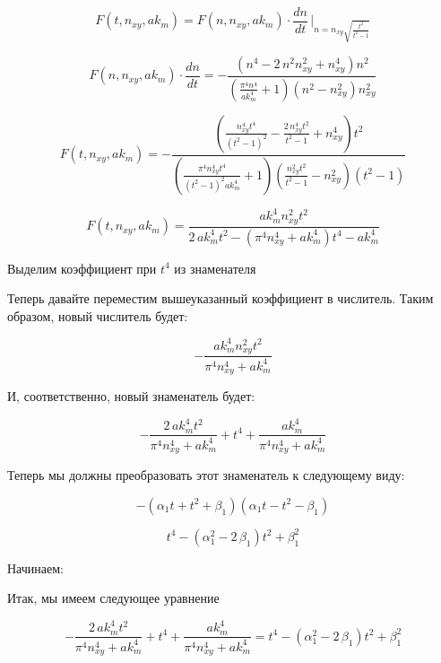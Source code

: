 \documentclass[11pt]{article}
\begin{document}
    \[F\left(t, n_{xy}, ak_m\right) = F\left(n, n_{xy}, ak_m\right) \cdot \frac{dn}{dt} \, \Bigg\rvert_{ n = n_{\mathit{xy}} \sqrt{\frac{t^{2}}{t^{2} - 1}} }\]

\[F\left(n, n_{xy}, ak_m\right) \cdot \frac{dn}{dt} = -\frac{{\left(n^{4} - 2 \, n^{2} n_{\mathit{xy}}^{2} + n_{\mathit{xy}}^{4}\right)} n^{2}}{{\left(\frac{\pi^{4} n^{4}}{\mathit{ak}_{m}^{4}} + 1\right)} {\left(n^{2} - n_{\mathit{xy}}^{2}\right)} n_{\mathit{xy}}^{2}}\]

\[F\left(t, n_{xy}, ak_m\right) = -\frac{{\left(\frac{n_{\mathit{xy}}^{4} t^{4}}{{\left(t^{2} - 1\right)}^{2}} - \frac{2 \, n_{\mathit{xy}}^{4} t^{2}}{t^{2} - 1} + n_{\mathit{xy}}^{4}\right)} t^{2}}{{\left(\frac{\pi^{4} n_{\mathit{xy}}^{4} t^{4}}{{\left(t^{2} - 1\right)}^{2} \mathit{ak}_{m}^{4}} + 1\right)} {\left(\frac{n_{\mathit{xy}}^{2} t^{2}}{t^{2} - 1} - n_{\mathit{xy}}^{2}\right)} {\left(t^{2} - 1\right)}}\]

\[F\left(t, n_{xy}, ak_m\right) = \frac{\mathit{ak}_{m}^{4} n_{\mathit{xy}}^{2} t^{2}}{2 \, \mathit{ak}_{m}^{4} t^{2} - {\left(\pi^{4} n_{\mathit{xy}}^{4} + \mathit{ak}_{m}^{4}\right)} t^{4} - \mathit{ak}_{m}^{4}}\]

    Выделим коэффициент при \(t^4\) из знаменателя

    Теперь давайте переместим вышеуказанный коэффициент в числитель. Таким
образом, новый числитель будет:

    \[-\frac{\mathit{ak}_{m}^{4} n_{\mathit{xy}}^{2} t^{2}}{\pi^{4} n_{\mathit{xy}}^{4} + \mathit{ak}_{m}^{4}}\]

    И, соответственно, новый знаменатель будет:

    \[-\frac{2 \, \mathit{ak}_{m}^{4} t^{2}}{\pi^{4} n_{\mathit{xy}}^{4} + \mathit{ak}_{m}^{4}} + t^{4} + \frac{\mathit{ak}_{m}^{4}}{\pi^{4} n_{\mathit{xy}}^{4} + \mathit{ak}_{m}^{4}}\]

    Теперь мы должны преобразовать этот знаменатель к следующему виду:

    \[-{\left(\alpha_{1} t + t^{2} + \beta_{1}\right)} {\left(\alpha_{1} t - t^{2} - \beta_{1}\right)}\]

\[t^{4} - {\left(\alpha_{1}^{2} - 2 \, \beta_{1}\right)} t^{2} + \beta_{1}^{2}\]

    Начинаем:

    Итак, мы имеем следующее уравнение

\[-\frac{2 \, \mathit{ak}_{m}^{4} t^{2}}{\pi^{4} n_{\mathit{xy}}^{4} + \mathit{ak}_{m}^{4}} + t^{4} + \frac{\mathit{ak}_{m}^{4}}{\pi^{4} n_{\mathit{xy}}^{4} + \mathit{ak}_{m}^{4}} = t^{4} - {\left(\alpha_{1}^{2} - 2 \, \beta_{1}\right)} t^{2} + \beta_{1}^{2}\]
\end{document}
